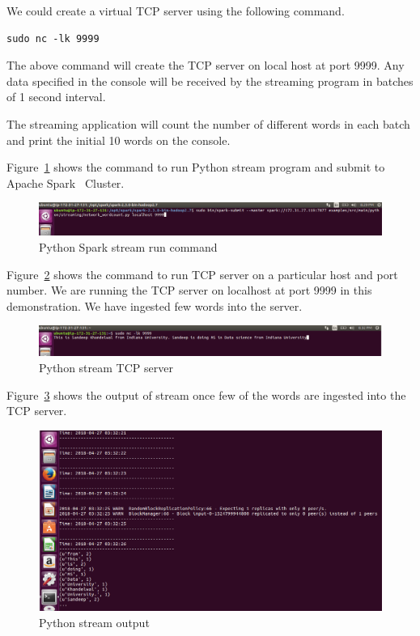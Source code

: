 We could create a virtual TCP server using the following command.

\begin{verbatim}
sudo nc -lk 9999
\end{verbatim}

The above command will create the TCP server on local host at port 9999. Any data specified in the console will be received by the streaming program in batches of 1 second interval.

The streaming application will count the number of different words in each batch and print the initial 10 words on the console.

Figure~\ref{f:python-spark-stream-run-command} shows the command to run Python stream program and submit to Apache Spark~\cite{hid-sp18-511-www-spark} Cluster.

\begin{figure}[!ht]
	\centering\includegraphics[width=\columnwidth]{images/pythonstreamprogruncoammand.png}
	\caption{Python Spark stream run command}\label{f:python-spark-stream-run-command}
\end{figure}

Figure~\ref{f:python-stream-tcp-server.png} shows the command to run TCP server on a particular host and port number. We are running the TCP server on localhost at port 9999 in this demonstration. We have ingested few words into the server.

\begin{figure}[!ht]
	\centering\includegraphics[width=\columnwidth]{images/pythonstreamtcpserver.png}
	\caption{Python stream TCP server}\label{f:python-stream-tcp-server.png}
\end{figure}

Figure~\ref{f:python_stream_prog_run_output.png} shows the output of stream once few of the words are ingested into the TCP server.

\begin{figure}[!ht]
	\centering\includegraphics[width=\columnwidth]{images/pythonstreamprogrunoutput.png}
	\caption{Python stream output}\label{f:python_stream_prog_run_output.png}
\end{figure}

